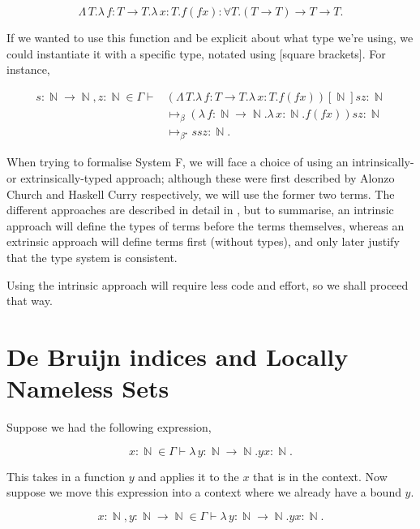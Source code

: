 \documentclass[logo,bsc,singlespacing,parskip,online]{infthesis}
\DeclareMathOperator{\nat}{\mathbb{N}}
\begin{document}
\begin{equation*}
  \Lambda \, T. \lambda \, f \colon T \to T . \lambda \, x \colon T . f (f x) \colon \forall T . (T \to T) \to T \to T.
\end{equation*}

If we wanted to use this function and be explicit about what type we're using, we could instantiate
it with a specific type, notated using [square brackets]. For instance,

\begin{align*}
  s \colon \nat \to \nat, z \colon \nat \in \Gamma \vdash &(\Lambda \, T. \lambda \, f \colon T \to T . \lambda \, x \colon T . f (f x))[\nat] s z \colon \nat\\
  &\mapsto_{\beta} (\lambda \, f \colon \nat \to \nat . \lambda \, x \colon \nat . f (f x)) s z \colon \nat\\
  &\mapsto_{\beta^{\star}} s s z \colon \nat.
\end{align*}

When trying to formalise System F, we will face a choice of using an
intrinsically- or extrinsically-typed approach; although these were first
described by Alonzo Church and Haskell Curry respectively, we will use the
former two terms. The different approaches are described in detail in
\citet{gries_what_2003}, but to summarise, an intrinsic approach will define the
types of terms before the terms themselves, whereas an extrinsic approach will
define terms first (without types), and only later justify that the type system
is consistent.

Using the intrinsic approach will require less code and effort, so we shall
proceed that way.

\section{De Bruijn indices and Locally Nameless Sets}

Suppose we had the following expression,

\begin{equation*}
  x \colon \nat \in \Gamma \vdash \lambda \, y \colon \nat \to \nat. y x \colon \nat.
\end{equation*}

This takes in a function $y$ and applies it to the $x$ that is in the context.
Now suppose we move this expression into a context where we already have a bound
$y$.

\begin{equation*}
  x \colon \nat, y \colon \nat \to \nat \in \Gamma \vdash \lambda \, y \colon \nat \to \nat. y x \colon \nat.
\end{equation*}
\end{document}
